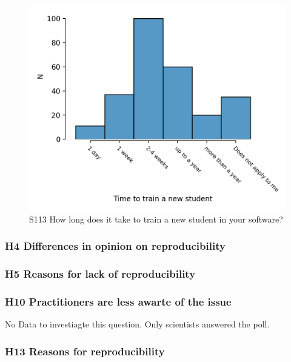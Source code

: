 \documentclass{article}
\begin{document}
\begin{figure}[!p]
    \centering
    \includegraphics[width=\textwidth]{../figs/S113.png}
	\caption{S113 How long does it take to train a new student in your software?}
    \label{fig:S113}
\end{figure}

\newpage

\subsubsection{H4 Differences in opinion on reproducibility}



\subsubsection{H5 Reasons for lack of reproducibility}



\subsubsection{H10 Practitioners are less awarte of the issue}

No Data to investiagte this question. Only scientists answered the poll.

\subsubsection{H13 Reasons for reproducibility}
\end{document}
